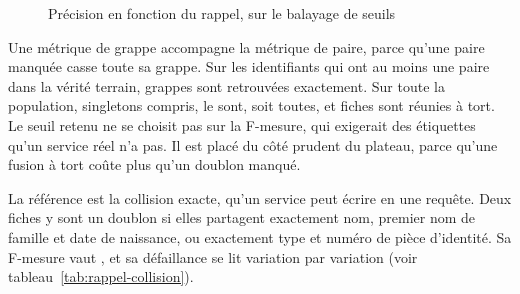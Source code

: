 \begin{figure}[htbp]
\centering
{}
\caption{Précision en fonction du rappel, sur le balayage de seuils}\label{fig:precision-rappel}
\end{figure}

Une métrique de grappe accompagne la métrique de paire, parce qu'une paire manquée casse toute sa
grappe. Sur les identifiants qui ont au moins une paire dans la vérité terrain,
 grappes sont retrouvées exactement. Sur toute la population,
singletons compris,  le sont, soit toutes, et
 fiches sont réunies à tort. Le seuil retenu ne se choisit pas sur la
F-mesure, qui exigerait des étiquettes qu'un service réel n'a pas. Il est placé du côté prudent du
plateau, parce qu'une fusion à tort coûte plus qu'un doublon manqué.

La référence est la collision exacte, qu'un service peut écrire en une requête. Deux fiches y sont
un doublon si elles partagent exactement nom, premier nom de famille et date de naissance, ou
exactement type et numéro de pièce d'identité. Sa F-mesure vaut , et sa
défaillance se lit variation par variation (voir tableau~\ref{tab:rappel-collision}).


